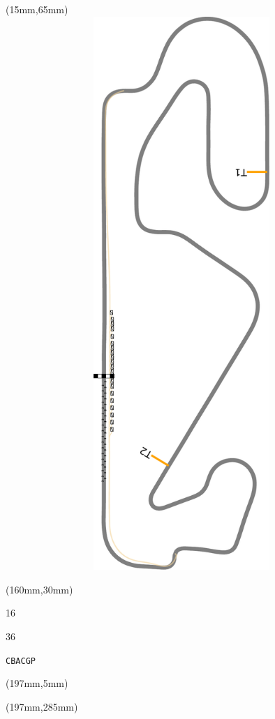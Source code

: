 \begin{textblock*}{185mm}(15mm,65mm)%
\centering
\mbox{\includegraphics[width=185mm,height=210mm,keepaspectratio]{PT/CBACGP.pdf}}
\end{textblock*}
\begin{textblock*}{40mm}(160mm,30mm)%
\Large
\par{} 
\par16 
\par36 
\par\hfill\tiny\tt CBACGP\\
\end{textblock*}
\begin{textblock*}{20mm}(197mm,5mm)%
\fbox{\thepage}
\label{CBACGP}
\end{textblock*}
\begin{textblock*}{20mm}(197mm,285mm)%
\fbox{\thepage}
\end{textblock*}

